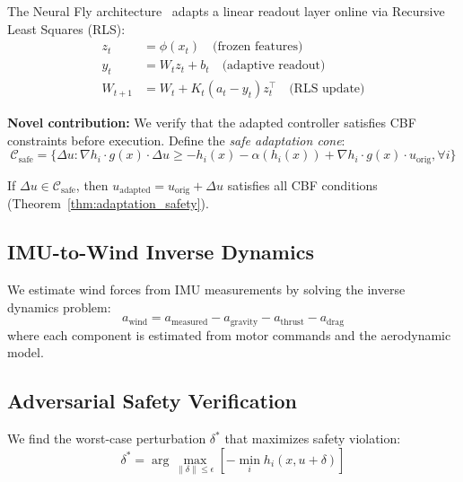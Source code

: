\label{sec:adaptation}

The Neural Fly architecture~\cite{dean2022neural} adapts a linear readout layer online via Recursive Least Squares (RLS):
\begin{align}
    z_t &= \phi(x_t) \quad \text{(frozen features)} \\
    y_t &= W_t z_t + b_t \quad \text{(adaptive readout)} \\
    W_{t+1} &= W_t + K_t(a_t - y_t)z_t^\top \quad \text{(RLS update)}
\end{align}

\textbf{Novel contribution:} We verify that the adapted controller satisfies CBF constraints before execution. Define the \emph{safe adaptation cone}:
\begin{equation}
    \mathcal{C}_{\text{safe}} = \{\Delta u : \nabla h_i \cdot g(x) \cdot \Delta u \geq -h_i(x) - \alpha(h_i(x)) + \nabla h_i \cdot g(x) \cdot u_{\text{orig}}, \forall i\}
\end{equation}

If $\Delta u \in \mathcal{C}_{\text{safe}}$, then $u_{\text{adapted}} = u_{\text{orig}} + \Delta u$ satisfies all CBF conditions (Theorem~\ref{thm:adaptation_safety}).

\subsection{IMU-to-Wind Inverse Dynamics}

\label{sec:wind}

We estimate wind forces from IMU measurements by solving the inverse dynamics problem:
\begin{equation}
    a_{\text{wind}} = a_{\text{measured}} - a_{\text{gravity}} - a_{\text{thrust}} - a_{\text{drag}}
\end{equation}
where each component is estimated from motor commands and the aerodynamic model.

\subsection{Adversarial Safety Verification}

\label{sec:adversarial}

We find the worst-case perturbation $\delta^*$ that maximizes safety violation:
\begin{equation}
    \delta^* = \arg\max_{\|\delta\| \leq \epsilon} \left[-\min_i h_i(x, u + \delta)\right]
\end{equation}

